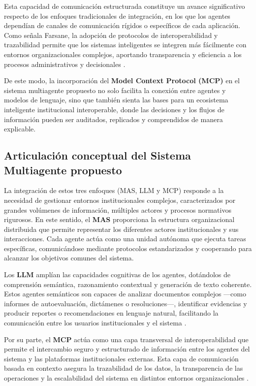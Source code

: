 \documentclass[12pt]{article}
\let\cite\citep
\begin{document}
Esta capacidad de comunicación estructurada constituye un avance significativo respecto de los enfoques tradicionales de integración, en los que los agentes dependían de canales de comunicación rígidos o específicos de cada aplicación. Como señala Farsane, la adopción de protocolos de interoperabilidad y trazabilidad permite que los sistemas inteligentes se integren más fácilmente con entornos organizacionales complejos, aportando transparencia y eficiencia a los procesos administrativos y decisionales \cite{farsane2025automatizacion}.

De este modo, la incorporación del \textbf{Model Context Protocol (MCP)} en el sistema multiagente propuesto no solo facilita la conexión entre agentes y modelos de lenguaje, sino que también sienta las bases para un ecosistema inteligente institucional interoperable, donde las decisiones y los flujos de información pueden ser auditados, replicados y comprendidos de manera explicable.


\subsection{Articulación conceptual del Sistema Multiagente propuesto}


La integración de estos tres enfoques (MAS, LLM y MCP) responde a la necesidad de gestionar entornos institucionales complejos, caracterizados por grandes volúmenes de información, múltiples actores y procesos normativos rigurosos. En este sentido, el \textbf{MAS} proporciona la estructura organizacional distribuida que permite representar los diferentes actores institucionales y sus interacciones. Cada agente actúa como una unidad autónoma que ejecuta tareas específicas, comunicándose mediante protocolos estandarizados y cooperando para alcanzar los objetivos comunes del sistema.

Los \textbf{LLM} amplían las capacidades cognitivas de los agentes, dotándolos de comprensión semántica, razonamiento contextual y generación de texto coherente. Estos agentes semánticos son capaces de analizar documentos complejos —como informes de autoevaluación, dictámenes o resoluciones—, identificar evidencias y producir reportes o recomendaciones en lenguaje natural, facilitando la comunicación entre los usuarios institucionales y el sistema \cite{agashe2023llm,farsane2025automatizacion}.

Por su parte, el \textbf{MCP} actúa como una capa transversal de interoperabilidad que permite el intercambio seguro y estructurado de información entre los agentes del sistema y las plataformas institucionales externas. Esta capa de comunicación basada en contexto asegura la trazabilidad de los datos, la transparencia de las operaciones y la escalabilidad del sistema en distintos entornos organizacionales \cite{ehtesham2025survey}.
\end{document}
